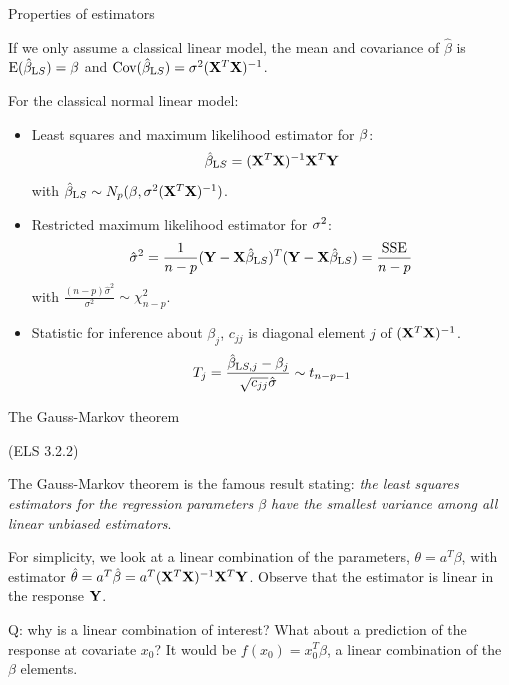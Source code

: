 \documentclass[
  ignorenonframetext,
]{beamer}
\begin{document}
\begin{frame}

\begin{block}{Properties of estimators}

If we only assume a classical linear model, the mean and covariance of
\(\hat{\beta}\) is \(\text{E}(\hat{\beta}_{\text LS})=\beta\) and
\(\text{Cov}(\hat{\beta}_{\text LS})=\sigma^2({\bf X}^T{\bf X})^{-1}\).

For the classical normal linear model:

\begin{itemize}
\item
  Least squares and maximum likelihood estimator for \({\bf \beta}\):
  \[ \hat{\beta}_{\text LS}=({\bf X}^T{\bf X})^{-1} {\bf X}^T {\bf Y}\]
  with
  \(\hat{\beta}_{\text LS}\sim N_{p}(\beta,\sigma^2({\bf X}^T{\bf X})^{-1})\).
\item
  Restricted maximum likelihood estimator for \({\bf \sigma}^2\):
  \[ \hat{\sigma}^2=\frac{1}{n-p}({\bf Y}-{\bf X}\hat{\beta}_{\text LS})^T({\bf Y}-{\bf X}\hat{\beta}_{\text LS})=\frac{\text{SSE}}{n-p}\]
  with \(\frac{(n-p)\hat{\sigma}^2}{\sigma^2} \sim \chi^2_{n-p}\).
\item
  Statistic for inference about \(\beta_j\), \(c_{jj}\) is diagonal
  element \(j\) of \(({\bf X}^T{\bf X})^{-1}\).
  \[ T_j=\frac{\hat{\beta}_{\text LS,j}-\beta_j}{\sqrt{c_{jj}}\hat{\sigma}}\sim t_{n-p-1}\]
\end{itemize}

\end{block}

\end{frame}

\begin{frame}

\begin{block}{The Gauss-Markov theorem}

(ELS 3.2.2)

The Gauss-Markov theorem is the famous result stating: \emph{the least
squares estimators for the regression parameters \(\beta\) have the
smallest variance among all linear unbiased estimators}.

For simplicity, we look at a linear combination of the parameters,
\(\theta=a^T \beta\), with estimator
\(\hat{\theta}=a^T \hat{\beta}=a^T ({\bf X}^T{\bf X})^{-1} {\bf X}^T {\bf Y}\).
Observe that the estimator is linear in the response \({\bf Y}\).

Q: why is a linear combination of interest? What about a prediction of
the response at covariate \(x_0\)? It would be \(f(x_0)=x_0^T \beta\), a
linear combination of the \(\beta\) elements.

\end{block}

\end{frame}
\end{document}
